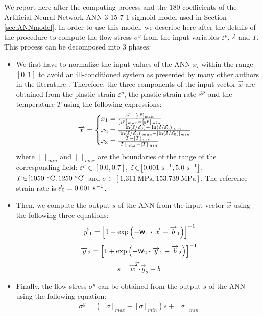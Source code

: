 \documentclass[metals,article,submit,pdftex,moreauthors]{Definitions/mdpi}
\DeclareRobustCommand{\w}{\mbox{\large\ensuremath{\mathsf{w}}}}
\DeclareRobustCommand{\dotp}{\boldsymbol{\cdot}}
\DeclareRobustCommand{\mdot}[1]{\accentset{\mbox{\bfseries .}}{#1}}
\DeclareRobustCommand{\ps}{\text{s}^{-1}}
\DeclareRobustCommand{\MPa}{\text{MPa}}
\begin{document}
We report here after the computing process and the $180$ coefficients of the Artificial Neural Network ANN-3-15-7-1-sigmoid model used in Section \ref{sec:ANNmodel}.
In order to use this model, we describe here after the details of the procedure to compute the flow stress $\sigma^y$ from the input variables $\varepsilon^p$, $\mdot\varepsilon$ and $T$.
This process can be decomposed into 3 phases:
\begin{itemize}
\item We first have to normalize the input values of the ANN $x_i$ within the range $[0,1]$ to avoid an ill-conditioned system as presented by many other authors in the literature \cite{Lin-2008-ANN, stoffel2020deep}.
Therefore, the three components of the input vector $\overrightarrow{x}$ are obtained from the plastic strain $\varepsilon^p$, the plastic strain rate $\mdot{\varepsilon}^p$ and the temperature $T$ using the following expressions:
\begin{equation}
\overrightarrow{x}=
\begin{cases}
x_1 = \frac{\varepsilon^p - [\varepsilon^p]_{min}}{[\varepsilon^p]_{max} - [\varepsilon^p]_{min}}\\
x_2 = \frac{\ln(\mdot{\varepsilon}/\mdot{\varepsilon_0})-[\ln(\mdot{\varepsilon}/\mdot{\varepsilon_0})]_{min}}{[\ln(\mdot{\varepsilon}/\mdot{\varepsilon_0})]_{max}-[\ln(\mdot{\varepsilon}/\mdot{\varepsilon_0})]_{min}}\label{eq:CR1}\\
x_3 = \frac{T-[T]_{min}}{[T]_{max}-[T]_{min}}
\end{cases}
\end{equation}
where $[~]_{min}$ and $[~]_{max}$ are the boundaries of the range of the corresponding field: $\varepsilon^p\!\in\!\left[0.0,0.7\right]$, $\mdot{\varepsilon}\!\in\!\left[0.001~\ps,5.0~\ps\right]$, $T\!\in\!\left[1050~\celsius,1250~\celsius\right]$ and $\sigma\!\in\!\left[1.311~\MPa,153.739~\MPa\right]$.
The reference strain rate is $\mdot{\varepsilon_0} = 0.001~\ps$.
\item Then, we compute the output $s$ of the ANN from the input vector $\overrightarrow{x}$ using the following three equations:
\begin{equation}
\overrightarrow{y}_1 = \left[1 + \exp{\left(- \w_1 \dotp \overrightarrow{x}- \overrightarrow{b}_1\right)}\right]^{-1}
\end{equation}
\begin{equation}
\overrightarrow{y}_2 = \left[1 + \exp{\left(- \w_2 \dotp \overrightarrow{y}_1- \overrightarrow{b}_2\right)}\right]^{-1}
\end{equation}
\begin{equation}
s = \overrightarrow{w}^T \dotp \overrightarrow{y}_2 + b
\end{equation}
\item Finally, the flow stress $\sigma^y$ can be obtained from the output $s$ of the ANN using the following equation:
\begin{equation}
\sigma^y = \left([\sigma]_{max}-[\sigma]_{min}\right)s + [\sigma]_{min} \label{eq:CR2}
\end{equation}
\end{itemize}
\end{document}
